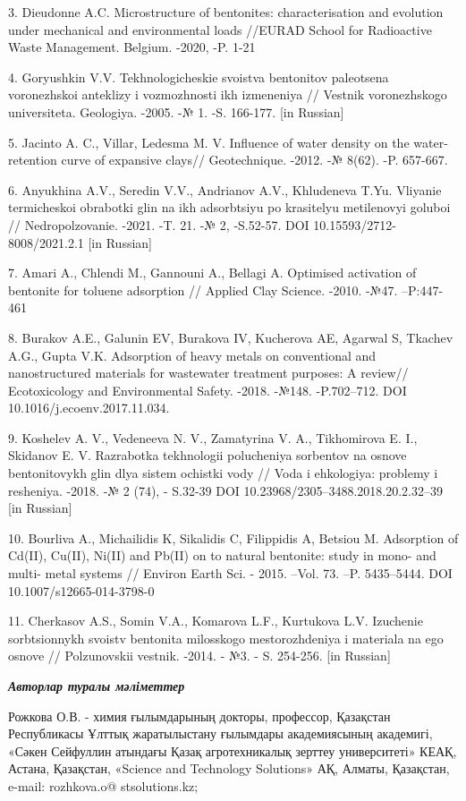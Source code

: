 3. Dieudonne A.C. Microstructure of bentonites: characterisation and
evolution under mechanical and environmental loads //EURAD School for
Radioactive Waste Management. Belgium. -2020, -P. 1-21

4. Goryushkin V.V. Tekhnologicheskie svoistva bentonitov paleotsena
voronezhskoi anteklizy i vozmozhnosti ikh izmeneniya // Vestnik
voronezhskogo universiteta. Geologiya. -2005. -№ 1. -S. 166-177. {[}in
Russian{]}

5. Jacinto A. C., Villar, Ledesma M. V. Influence of water density on
the water-retention curve of expansive clays// Geotechnique. -2012. -№
8(62). -P. 657-667.

6. Anyukhina A.V., Seredin V.V., Andrianov A.V., Khludeneva T.Yu.
Vliyanie termicheskoi obrabotki glin na ikh adsorbtsiyu po krasitelyu
metilenovyi goluboi // Nedropol\textquotesingle zovanie. -2021. -T. 21.
-№ 2, -S.52-57. DOI 10.15593/2712-8008/2021.2.1 {[}in Russian{]}

7. Amari A., Chlendi M., Gannouni A., Bellagi A. Optimised activation of
bentonite for toluene adsorption // Applied Clay Science. -2010. -№47.
--P:447-461

8. Burakov A.E., Galunin EV, Burakova IV, Kucherova AE, Agarwal S,
Tkachev A.G., Gupta V.K. Adsorption of heavy metals on conventional and
nanostructured materials for wastewater treatment purposes: A review//
Ecotoxicology and Environmental Safety. -2018. -№148. -P.702--712. DOI
10.1016/j.ecoenv.2017.11.034.

9. Koshelev A. V., Vedeneeva N. V., Zamatyrina V. A., Tikhomirova E. I.,
Skidanov E. V. Razrabotka tekhnologii polucheniya sorbentov na osnove
bentonitovykh glin dlya sistem ochistki vody // Voda i ehkologiya:
problemy i resheniya. -2018. -№ 2 (74), - S.32-39 DOI
10.23968/2305--3488.2018.20.2.32--39 {[}in Russian{]}

10. Bourliva A., Michailidis K, Sikalidis C, Filippidis A, Betsiou M.
Adsorption of Cd(II), Cu(II), Ni(II) and Pb(II) on to natural bentonite:
study in mono- and multi- metal systems // Environ Earth Sci. - 2015.
--Vol. 73. --P. 5435--5444. DOI 10.1007/s12665-014-3798-0

11. Cherkasov A.S., Somin V.A., Komarova L.F., Kurtukova L.V. Izuchenie
sorbtsionnykh svoistv bentonita milosskogo mestorozhdeniya i materiala
na ego osnove // Polzunovskii vestnik. -2014. - №3. - S. 254-256. {[}in
Russian{]}

\emph{{\bfseries Авторлар туралы мәліметтер}}

Рожкова О.В. - химия ғылымдарының докторы, профессор, Қазақстан
Республикасы Ұлттық жаратылыстану ғылымдары академиясының академигі,
«Сәкен Сейфуллин атындағы Қазақ агротехникалық зерттеу университеті»
КЕАҚ, Астана, Қазақстан, «Science and Technology Solutions» АҚ, Алматы,
Қазақстан, e-mail: rozhkova.o@ stsolutions.kz;

